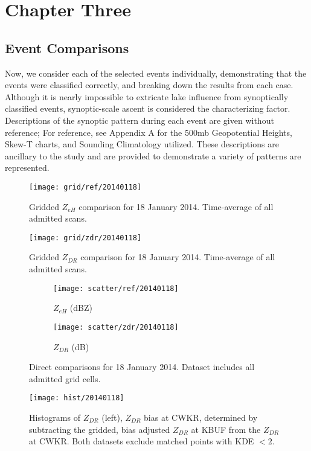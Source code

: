 \chapter{Chapter Three}

\section{Event Comparisons}
Now, we consider each of the selected events individually, demonstrating that the events were classified correctly, and breaking down the results from each case. Although it is nearly impossible to extricate lake influence from synoptically classified events, synoptic-scale ascent is considered the characterizing factor. Descriptions of the synoptic pattern during each event are given without reference; For reference, see Appendix A for the 500mb Geopotential Heights, Skew-T charts, and Sounding Climatology utilized. These descriptions are ancillary to the study and are provided to demonstrate a variety of patterns are represented.

\begin{figure}[p]
\texttt{[image: grid/ref/20140118]}
\caption{Gridded $Z_{eH}$ comparison for 18 January 2014. Time-average of all admitted scans.} 
\label{fig:grid_ref_20140118}
\end{figure}

\begin{figure}[p]
\texttt{[image: grid/zdr/20140118]}
\caption{Gridded $Z_{DR}$ comparison for 18 January 2014. Time-average of all admitted scans.} 
\label{fig:grid_zdr_20140118}
\end{figure}

\begin{figure}[p]
\centering
   \begin{subfigure}{0.49\linewidth} \centering
     \texttt{[image: scatter/ref/20140118]}
     \caption{$Z_{eH}$ (dBZ)}\label{fig:scatter_ref_20140118}
   \end{subfigure}
   \begin{subfigure}{0.49\linewidth} \centering
     \texttt{[image: scatter/zdr/20140118]}
     \caption{$Z_{DR}$ (dB)}\label{fig:scatter_zdr_20140118}
   \end{subfigure}
\caption{Direct comparisons for 18 January 2014. Dataset includes all admitted grid cells.} \label{fig:scatter_20140118}
\end{figure}

\begin{figure}[p]
\texttt{[image: hist/20140118]}\centering
\caption{Histograms of $Z_{DR}$ (left), $Z_{DR}$ bias at CWKR, determined by subtracting the gridded, bias adjusted $Z_{DR}$ at KBUF from the $Z_{DR}$ at
CWKR. Both datasets exclude matched points with KDE $< 2$. } 
\label{fig:hist_20140118}
\end{figure}

